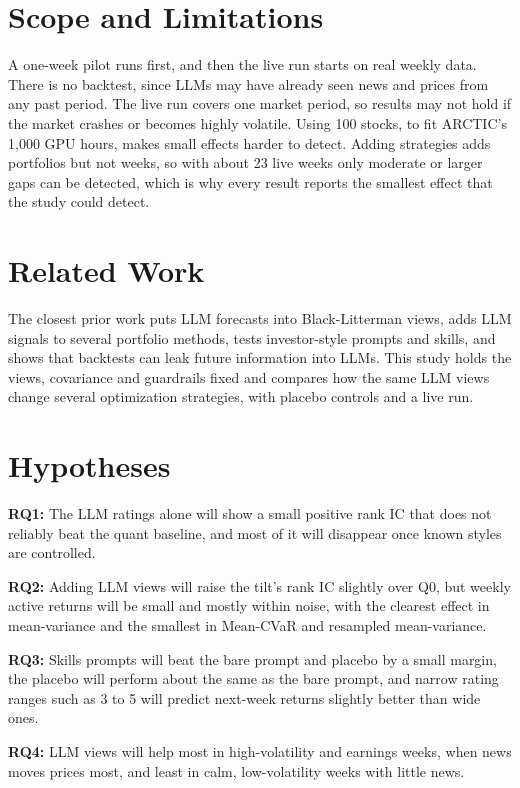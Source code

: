 \documentclass[conference]{IEEEtran}
\begin{document}
\section{Scope and Limitations}
A one-week pilot runs first, and then the live run starts on real weekly data. There is no backtest, since LLMs may have already seen news and prices from any past period. The live run covers one market period, so results may not hold if the market crashes or becomes highly volatile. Using 100 stocks, to fit ARCTIC's 1,000 GPU hours, makes small effects harder to detect. Adding strategies adds portfolios but not weeks, so with about 23 live weeks only moderate or larger gaps can be detected, which is why every result reports the smallest effect that the study could detect.

\section{Related Work}
The closest prior work puts LLM forecasts into Black-Litterman views, adds LLM signals to several portfolio methods, tests investor-style prompts and skills, and shows that backtests can leak future information into LLMs. This study holds the views, covariance and guardrails fixed and compares how the same LLM views change several optimization strategies, with placebo controls and a live run.

\section{Hypotheses}
\noindent\textbf{RQ1:} The LLM ratings alone will show a small positive rank IC that does not reliably beat the quant baseline, and most of it will disappear once known styles are controlled.

\noindent\textbf{RQ2:} Adding LLM views will raise the tilt's rank IC slightly over Q0, but weekly active returns will be small and mostly within noise, with the clearest effect in mean-variance and the smallest in Mean-CVaR and resampled mean-variance.

\noindent\textbf{RQ3:} Skills prompts will beat the bare prompt and placebo by a small margin, the placebo will perform about the same as the bare prompt, and narrow rating ranges such as 3 to 5 will predict next-week returns slightly better than wide ones.

\noindent\textbf{RQ4:} LLM views will help most in high-volatility and earnings weeks, when news moves prices most, and least in calm, low-volatility weeks with little news.
\end{document}
